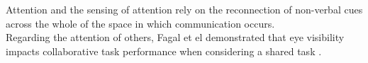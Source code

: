 Attention and the sensing of attention rely on the reconnection of non-verbal cues across the whole of the space in which communication occurs. \\%
Regarding the attention of others, Fagal et el demonstrated that eye visibility impacts collaborative task performance when considering a shared task \cite{Fagel2010}.\\
